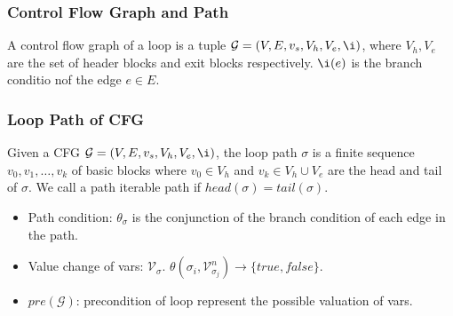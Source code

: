 \documentclass[11pt]{beamer}
\begin{document}
\begin{frame}\frametitle{Control Flow Graph and Path}
\begin{definition}
A control flow graph of a loop is a tuple $\mathcal{G} = (V,E,v_s, V_h, V_e, \i)$, where $V_h, V_e$ are the set of header blocks and exit blocks respectively. $\i(e)$ is the branch conditio nof the edge $e\in E$.

\end{definition}

\begin{definition}\frametitle{Loop Path of CFG}
Given a CFG $\mathcal{G} = (V,E,v_s, V_h, V_e, \i)$, the loop path $\sigma$ is a finite sequence $v_0,v_1, \ldots, v_k$ of basic blocks where $v_0 \in V_h$ and $v_k\in V_h\cup V_e$ are the head and tail of $\sigma$. We call a path iterable path if $head(\sigma) = tail(\sigma)$.

\begin{itemize}
\item Path condition: $\theta_\sigma$ is the conjunction of the branch condition of each edge in the path.
\item Value change of vars: $\mathcal{V}_\sigma$. $\theta(\sigma_i, \mathcal{V}^n_{\sigma_j})\rightarrow \{true, false\}$.
\item $pre(\mathcal{G})$: precondition of loop represent the possible valuation of vars.	
\end{itemize}
\end{definition}
\end{frame}
\end{document}
